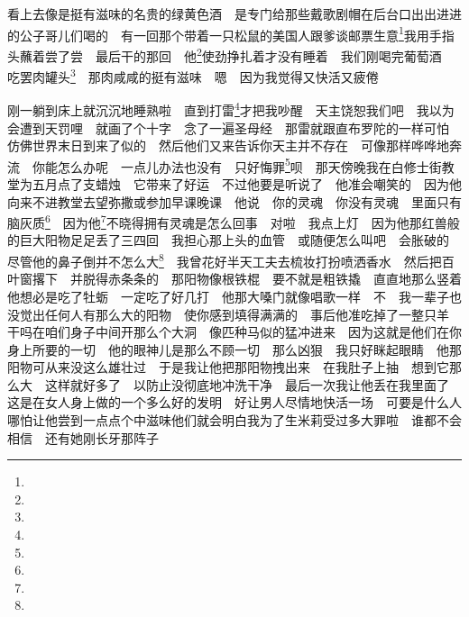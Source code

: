 \par 看上去像是挺有滋味的名贵的绿黄色酒　是专门给那些戴歌剧帽在后台口出出进进的公子哥儿们喝的　有一回那个带着一只松鼠的美国人跟爹谈邮票生意\footnote{}我用手指头蘸着尝了尝　最后干的那回　他\footnote{}使劲挣扎着才没有睡着　我们刚喝完葡萄酒　吃罢肉罐头\footnote{}　那肉咸咸的挺有滋味　嗯　因为我觉得又快活又疲倦　
\par 刚一躺到床上就沉沉地睡熟啦　直到打雷\footnote{}才把我吵醒　天主饶恕我们吧　我以为会遭到天罚哩　就画了个十字　念了一遍圣母经　那雷就跟直布罗陀的一样可怕　仿佛世界末日到来了似的　然后他们又来告诉你天主并不存在　可像那样哗哗地奔流　你能怎么办呢　一点儿办法也没有　只好悔罪\footnote{}呗　那天傍晚我在白修士街教堂为五月点了支蜡烛　它带来了好运　不过他要是听说了　他准会嘲笑的　因为他向来不进教堂去望弥撒或参加早课晚课　他说　你的灵魂　你没有灵魂　里面只有脑灰质\footnote{}　因为他\footnote{}不晓得拥有灵魂是怎么回事　对啦　我点上灯　因为他那红兽般的巨大阳物足足丢了三四回　我担心那上头的血管　或随便怎么叫吧　会胀破的　尽管他的鼻子倒并不怎么大\footnote{}　我曾花好半天工夫去梳妆打扮喷洒香水　然后把百叶窗撂下　并脱得赤条条的　那阳物像根铁棍　要不就是粗铁撬　直直地那么竖着　他想必是吃了牡蛎　一定吃了好几打　他那大嗓门就像唱歌一样　不　我一辈子也没觉出任何人有那么大的阳物　使你感到填得满满的　事后他准吃掉了一整只羊　干吗在咱们身子中间开那么个大洞　像匹种马似的猛冲进来　因为这就是他们在你身上所要的一切　他的眼神儿是那么不顾一切　那么凶狠　我只好眯起眼睛　他那阳物可从来没这么雄壮过　于是我让他把那阳物拽出来　在我肚子上抽　想到它那么大　这样就好多了　以防止没彻底地冲洗干净　最后一次我让他丢在我里面了　这是在女人身上做的一个多么好的发明　好让男人尽情地快活一场　可要是什么人哪怕让他尝到一点点个中滋味他们就会明白我为了生米莉受过多大罪啦　谁都不会相信　还有她刚长牙那阵子　
